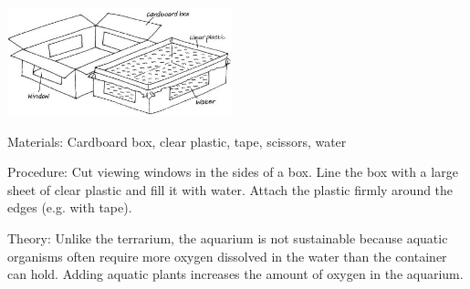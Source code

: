 \begin{multicols}{2}
\begin{center}
\includegraphics[width=0.49\textwidth]{./img/vso/aquarium.jpg}
\end{center}

\begin{description*}
\item[Materials:]{Cardboard box, clear plastic, tape, scissors, water}
\item[Procedure:]{Cut viewing windows in the sides of a box. Line the box with a large sheet of clear plastic and fill it with water. Attach the plastic firmly around the edges (e.g. with tape).}
\item[Theory:]{Unlike the terrarium, the aquarium is not sustainable because aquatic organisms often require more oxygen dissolved  in the water than the container can hold. Adding aquatic plants increases the amount of oxygen in the aquarium.}
\end{description*}

\columnbreak

%
%


\end{multicols}
